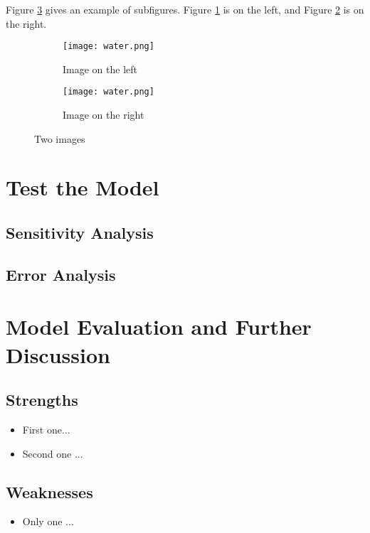 \documentclass[12pt]{article}  %
\begin{document}
Figure \ref{fig:subfigures} gives an example of subfigures. Figure \ref{subfig:left} is on the left, and Figure \ref{subfig:right} is on the right.

\begin{figure}[htbp]
\centering
\begin{subfigure}[b]{.4\textwidth}
\texttt{[image: water.png]}
\caption{Image on the left}\label{subfig:left}
\end{subfigure}
\begin{subfigure}[b]{.4\textwidth}
\texttt{[image: water.png]}
\caption{Image on the right}\label{subfig:right}
\end{subfigure}
\caption{Two images}\label{fig:subfigures}
\end{figure}

\section{Test the Model}

\subsection{Sensitivity Analysis}

\subsection{Error Analysis}


\section{Model Evaluation and Further Discussion}
\subsection{Strengths}
\begin{itemize}
    \item First one...
    \item Second one ...
\end{itemize}

\subsection{Weaknesses}
\begin{itemize}
    \item Only one ...
 \end{itemize}
 
\end{document}
